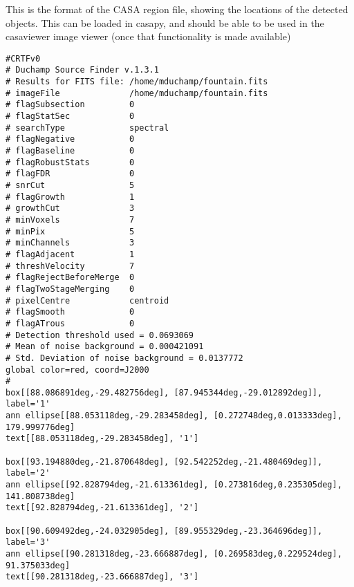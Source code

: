%
%
%
%
\label{app-casa}

This is the format of the CASA region file, showing the locations
of the detected objects. This can be loaded in casapy, and should be
able to be used in the casaviewer image viewer (once that
functionality is made available)

\begin{verbatim}
#CRTFv0
# Duchamp Source Finder v.1.3.1
# Results for FITS file: /home/mduchamp/fountain.fits
# imageFile              /home/mduchamp/fountain.fits
# flagSubsection         0
# flagStatSec            0
# searchType             spectral
# flagNegative           0
# flagBaseline           0
# flagRobustStats        0
# flagFDR                0
# snrCut                 5
# flagGrowth             1
# growthCut              3
# minVoxels              7
# minPix                 5
# minChannels            3
# flagAdjacent           1
# threshVelocity         7
# flagRejectBeforeMerge  0
# flagTwoStageMerging    0
# pixelCentre            centroid
# flagSmooth             0
# flagATrous             0
# Detection threshold used = 0.0693069
# Mean of noise background = 0.000421091
# Std. Deviation of noise background = 0.0137772
global color=red, coord=J2000 
#
box[[88.086891deg,-29.482756deg], [87.945344deg,-29.012892deg]], label='1'
ann ellipse[[88.053118deg,-29.283458deg], [0.272748deg,0.013333deg], 179.999776deg]
text[[88.053118deg,-29.283458deg], '1']

box[[93.194880deg,-21.870648deg], [92.542252deg,-21.480469deg]], label='2'
ann ellipse[[92.828794deg,-21.613361deg], [0.273816deg,0.235305deg], 141.808738deg]
text[[92.828794deg,-21.613361deg], '2']

box[[90.609492deg,-24.032905deg], [89.955329deg,-23.364696deg]], label='3'
ann ellipse[[90.281318deg,-23.666887deg], [0.269583deg,0.229524deg], 91.375033deg]
text[[90.281318deg,-23.666887deg], '3']
\end{verbatim}
